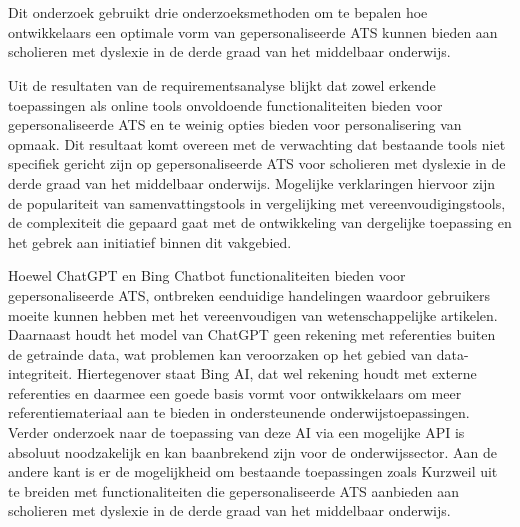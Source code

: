 
\chapter{}%
\label{ch:discussie}

Dit onderzoek gebruikt drie onderzoeksmethoden om te bepalen hoe ontwikkelaars een optimale vorm van gepersonaliseerde ATS kunnen bieden aan scholieren met dyslexie in de derde graad van het middelbaar onderwijs.

\medspace

Uit de resultaten van de requirementsanalyse blijkt dat zowel erkende toepassingen als online tools onvoldoende functionaliteiten bieden voor gepersonaliseerde ATS en te weinig opties bieden voor personalisering van opmaak. Dit resultaat komt overeen met de verwachting dat bestaande tools niet specifiek gericht zijn op gepersonaliseerde ATS voor scholieren met dyslexie in de derde graad van het middelbaar onderwijs. Mogelijke verklaringen hiervoor zijn de populariteit van samenvattingstools in vergelijking met vereenvoudigingstools, de complexiteit die gepaard gaat met de ontwikkeling van dergelijke toepassing en het gebrek aan initiatief binnen dit vakgebied.

Hoewel ChatGPT en Bing Chatbot functionaliteiten bieden voor gepersonaliseerde ATS, ontbreken eenduidige handelingen waardoor gebruikers moeite kunnen hebben met het vereenvoudigen van wetenschappelijke artikelen. Daarnaast houdt het model van ChatGPT geen rekening met referenties buiten de getrainde data, wat problemen kan veroorzaken op het gebied van data-integriteit. Hiertegenover staat Bing AI, dat wel rekening houdt met externe referenties en daarmee een goede basis vormt voor ontwikkelaars om meer referentiemateriaal aan te bieden in ondersteunende onderwijstoepassingen. Verder onderzoek naar de toepassing van deze AI via een mogelijke API is absoluut noodzakelijk en kan baanbrekend zijn voor de onderwijssector. Aan de andere kant is er de mogelijkheid om bestaande toepassingen zoals Kurzweil uit te breiden met functionaliteiten die gepersonaliseerde ATS aanbieden aan scholieren met dyslexie in de derde graad van het middelbaar onderwijs.

\medspace

